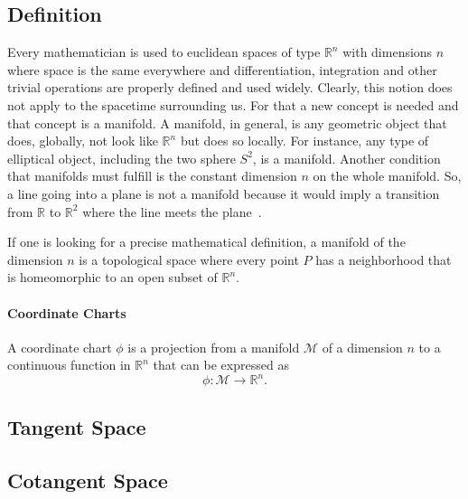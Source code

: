 \subsection{Definition}
\label{subsec:def-manifold}

Every mathematician is used to euclidean spaces of type $\mathbb{R}^n$ 
with dimensions $n$ where space is the same everywhere and differentiation, 
integration and other trivial operations are properly defined and used 
widely. Clearly, this notion does not apply to the spacetime surrounding 
us. For that a new concept is needed and that concept is a manifold.
A manifold, in general, is any geometric object that does, globally, not 
look like $\mathbb{R}^n$ but does so locally. For instance, any type of 
elliptical object, including the two sphere $S^2$, is a 
manifold. Another condition that manifolds must fulfill is the constant 
dimension $n$ on the whole manifold. So, a line going into a plane is 
not a manifold because it would imply a transition from $\mathbb{R}$ to 
$\mathbb{R}^2$ where the line meets the plane~\cite{Book:general_relativity_03_carroll}.

If one is looking for a precise mathematical definition, a manifold 
of the dimension $n$ is a topological space where every point $P$ has a neighborhood that is homeomorphic to an open subset of $\mathbb{R}^n$.

\paragraph{Coordinate Charts}

A coordinate chart $\phi$ is a projection from a manifold $\mathcal{M}$ of 
a dimension $n$ to a continuous function in $\mathbb{R}^n$ that can 
be expressed as 
\begin{equation}
  \phi: \mathcal{M} \rightarrow \mathbb{R}^n. 
  \label{eq:chart}
\end{equation}



\subsection{Tangent Space}
\label{subsec:tangent-space}



\subsection{Cotangent Space}
\label{subsec:cotangent-space}

